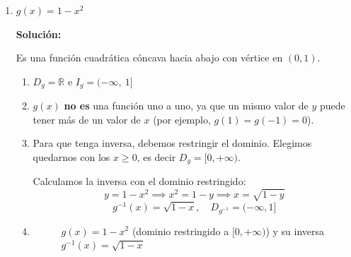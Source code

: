\documentclass[12pt]{article}
\begin{document}
\begin{enumerate}[label=\alph*.-]
\newpage

\item $g(x) = 1 - x^2$

\textbf{Solución:}

Es una función cuadrática cóncava hacia abajo con vértice en $(0, 1)$.

\begin{enumerate}[label=\roman*.]
    \item $D_g = \mathbb{R}$ \quad e \quad $I_g = (-\infty,\ 1]$

    \item $g(x)$ \textbf{no es} una función uno a uno, ya que un mismo valor de $y$ puede tener más de un valor de $x$ (por ejemplo, $g(1) = g(-1) = 0$).

    \item Para que tenga inversa, debemos restringir el dominio. Elegimos quedarnos con los $x \geq 0$, es decir $D_g = [0, +\infty)$.

    Calculamos la inversa con el dominio restringido:
    \[
    y = 1 - x^2 \implies x^2 = 1 - y \implies x = \sqrt{1 - y}
    \]
    \[
    \boxed{g^{-1}(x) = \sqrt{1 - x}, \quad D_{g^{-1}} = (-\infty, 1]}
    \]

    \item
    \begin{figure}[H]
        \centering
        \caption{$g(x) = 1 - x^2$ (dominio restringido a $[0,+\infty)$) y su inversa $g^{-1}(x) = \sqrt{1-x}$}
    \end{figure}
\end{enumerate}


\end{enumerate}
\end{document}
